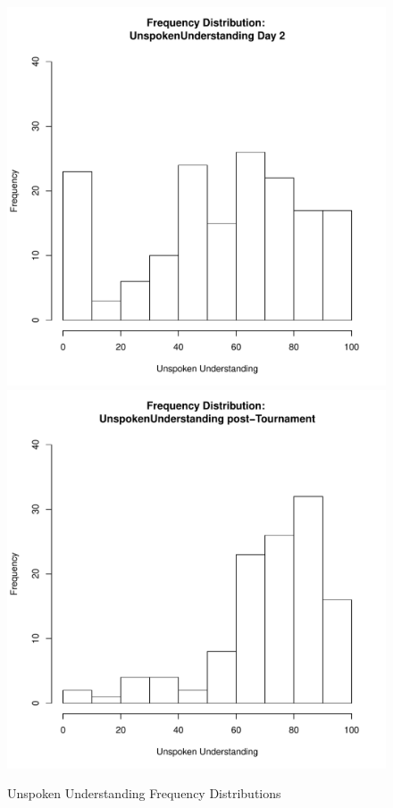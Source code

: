 \documentclass[12pt]{report}
\begin{document}
{\begin{figure}[htbp]
  \includegraphics[scale =.4]{../images/distUnspokenUnderstandingDay2.pdf}
  \includegraphics[scale =.4]{../images/distUnspokenUnderstandingPost.pdf}
  \caption{Unspoken Understanding Frequency Distributions}
  \label{fig:unspokenUnderstandingDist}
\end{figure}


}
\end{document}
